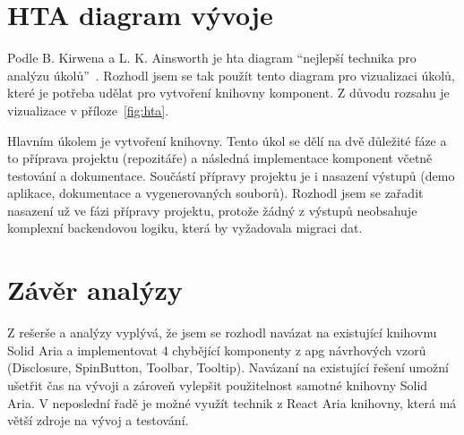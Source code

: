 \section{HTA diagram vývoje}

Podle B. Kirwena a L. K. Ainsworth je \gls{hta} diagram ``nejlepší technika pro analýzu úkolů''~\cite{kirwan1992}.
Rozhodl jsem se tak použít tento diagram pro vizualizaci úkolů, které je potřeba udělat pro vytvoření knihovny komponent.
Z důvodu rozsahu je vizualizace v příloze~\ref{fig:hta}.

Hlavním úkolem je vytvoření knihovny. Tento úkol se dělí na dvě důležité fáze a to příprava projektu (repozitáře) a následná implementace komponent včetně testování a dokumentace.
Součástí přípravy projektu je i nasazení výstupů (demo aplikace, dokumentace a vygenerovaných souborů).
Rozhodl jsem se zařadit nasazení už ve fázi přípravy projektu, protože žádný z výstupů neobsahuje komplexní backendovou logiku, která by vyžadovala migraci dat.

\section{Závěr analýzy}

Z rešerše a analýzy vyplývá, že jsem se rozhodl navázat na existující knihovnu Solid Aria a implementovat 4 chybějící komponenty z \gls{apg} návrhových vzorů (Disclosure, SpinButton, Toolbar, Tooltip).
Navázaní na existující řešení umožní ušetřit čas na vývoji a zároveň vylepšit použitelnost samotné knihovny Solid Aria.
V neposlední řadě je možné využít technik z React Aria knihovny, která má větší zdroje na vývoj a testování.
